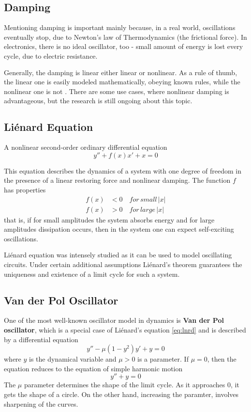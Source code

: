 \documentclass[journal]{IEEEtran}
\begin{document}
\subsection{Damping}
Mentioning damping is important mainly because, in a real world, oscillations eventually stop, due to Newton's law of Thermodynamics (the frictional force). In electronics, there is no ideal oscillator, too - small amount of energy is lost every cycle, due to electric resistance.

Generally, the damping is linear either linear or nonlinear. As a rule of thumb, the linear one is easily modeled mathematically, obeying known rules, while the nonlinear one is not \cite{institute1989estimation}. There are some use cases, where nonlinear damping is advantageous, but the research is still ongoing about this topic.

\subsection{Li\'{e}nard Equation}
A nonlinear second-order ordinary differential equation
\begin{equation}
\label{eq:lnrd}
y''+f(x)x'+x=0
\end{equation}

This equation describes the dynamics of a system with one degree of freedom in the presence of a linear restoring force and nonlinear damping. The function $f$ has properties
\begin{align*}
f(x)&<0\quad for\,small\,|x| \\
f(x)&>0\quad for\,large\,|x|
\end{align*}
that is, if for small amplitudes the system absorbs energy and for large amplitudes dissipation occurs, then in the system one can expect self-exciting oscillations.

Li\'{e}nard equation was intensely studied as it can be used to model oscillating circuits. Under certain additional assumptions Li\'{e}nard's theorem guarantees the uniqueness and existence of a limit cycle for such a system.

\subsection{Van der Pol Oscillator}
One of the most well-known oscillator model in dynamics is \textbf{Van der Pol oscillator}, which is a special case of Li\'{e}nard's equation \eqref{eq:lnrd} and is described by a differential equation
\begin{equation}
\label{eq:vdp}
y''-\mu\left(1-y^2\right)y'+y=0
\end{equation}
where $y$ is the dynamical variable and $\mu>0$ is a parameter. If $\mu=0$, then the equation reduces to the equation of simple harmonic motion
$$y''+y=0$$
The $\mu$ parameter determines the shape of the limit cycle. As it approaches 0, it gets the shape of a circle. On the other hand, increasing the paramter, involves sharpening of the curves.
\end{document}
